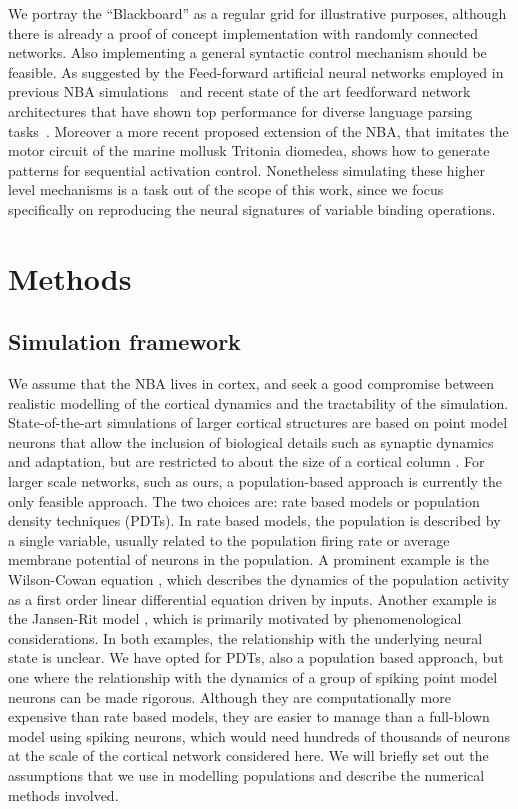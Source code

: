 \documentclass[10pt]{article}
\begin{document}
We portray the ``Blackboard'' as a regular grid for illustrative purposes, although there is already a proof of concept implementation with randomly connected networks\cite{van_der_Velde_2011}.
Also implementing a general syntactic control mechanism should be feasible. As suggested by the Feed-forward artificial neural networks employed in previous NBA simulations~\cite{van_der_Velde_2010} and recent state of the art feedforward network architectures that have shown top performance for diverse language parsing tasks~\cite{andor2016globally}.
Moreover a more recent proposed extension of the NBA, that imitates the motor circuit of the marine mollusk Tritonia diomedea, shows how to generate patterns for sequential activation control\cite{van_Dijk_2015}.
Nonetheless simulating these higher level mechanisms is a task out of the scope of this work, since we focus specifically on reproducing the neural signatures of variable binding operations.


\section{Methods}

{\label{488128}}

\subsection{Simulation framework}\label{simulation-framework}
We assume that the NBA lives in cortex, and  seek a good compromise between realistic modelling of the cortical dynamics and the tractability of the simulation.
State-of-the-art simulations of larger cortical structures are based on point model neurons that allow the inclusion of biological details such as synaptic dynamics and adaptation, but are restricted to about the size of a cortical column \cite{potjans2014}.
For larger scale networks, such as ours, a population-based approach is currently the only feasible approach.
The two choices are: rate based models or population density techniques (PDTs).
In rate based models, the population is described by a single variable, usually related to the population firing rate or average membrane potential of neurons in the population. 
A prominent example is the  Wilson-Cowan equation \cite{wilson1972}, which describes the dynamics of the population activity as a first order linear differential equation driven by inputs.
Another example is the Jansen-Rit model \cite{jansen1995}, which is primarily motivated by phenomenological considerations.
In both examples, the relationship with the underlying neural state is unclear. We have opted for PDTs, also a population based approach,  but one where the relationship with the dynamics of  a group of spiking point model neurons can be made rigorous.
Although they are computationally more expensive than rate based models, they are easier to manage than a full-blown model using spiking neurons, which would need hundreds of thousands of neurons at the scale of the cortical network considered here.
We will briefly set out the assumptions that we use in modelling populations and describe the numerical methods involved.
\end{document}
